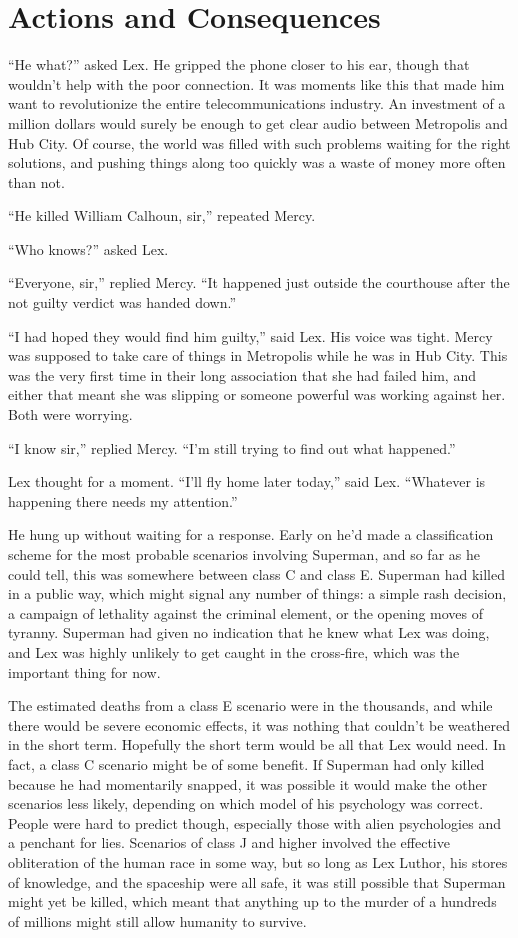 \chapter{Actions and Consequences}\label{actions-and-consequences}

``He what?'' asked Lex. He gripped the phone closer to his ear, though
that wouldn't help with the poor connection. It was moments like this
that made him want to revolutionize the entire telecommunications
industry. An investment of a million dollars would surely be enough to
get clear audio between Metropolis and Hub City. Of course, the world
was filled with such problems waiting for the right solutions, and
pushing things along too quickly was a waste of money more often than
not.

``He killed William Calhoun, sir,'' repeated Mercy.

``Who knows?'' asked Lex.

``Everyone, sir,'' replied Mercy. ``It happened just outside the
courthouse after the not guilty verdict was handed down.''

``I had hoped they would find him guilty,'' said Lex. His voice was
tight. Mercy was supposed to take care of things in Metropolis while he
was in Hub City. This was the very first time in their long association
that she had failed him, and either that meant she was slipping or
someone powerful was working against her. Both were worrying.

``I know sir,'' replied Mercy. ``I'm still trying to find out what
happened.''

Lex thought for a moment. ``I'll fly home later today,'' said Lex.
``Whatever is happening there needs my attention.''

He hung up without waiting for a response. Early on he'd made a
classification scheme for the most probable scenarios involving
Superman, and so far as he could tell, this was somewhere between class
C and class E. Superman had killed in a public way, which might signal
any number of things: a simple rash decision, a campaign of lethality
against the criminal element, or the opening moves of tyranny. Superman
had given no indication that he knew what Lex was doing, and Lex was
highly unlikely to get caught in the cross‐fire, which was the important
thing for now.

The estimated deaths from a class E scenario were in the thousands, and
while there would be severe economic effects, it was nothing that
couldn't be weathered in the short term. Hopefully the short term would
be all that Lex would need. In fact, a class C scenario might be of some
benefit. If Superman had only killed because he had momentarily snapped,
it was possible it would make the other scenarios less likely, depending
on which model of his psychology was correct. People were hard to
predict though, especially those with alien psychologies and a penchant
for lies. Scenarios of class J and higher involved the effective
obliteration of the human race in some way, but so long as Lex Luthor,
his stores of knowledge, and the spaceship were all safe, it was still
possible that Superman might yet be killed, which meant that anything up
to the murder of a hundreds of millions might still allow humanity to
survive.

